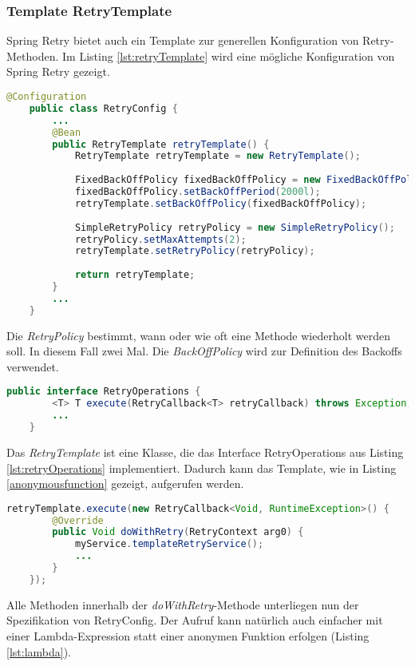 \subsubsection{Template RetryTemplate}
Spring Retry bietet auch ein Template zur generellen Konfiguration von Retry-Methoden. Im Listing \ref{lst:retryTemplate} wird eine mögliche Konfiguration von Spring Retry gezeigt.

\begin{lstlisting}[language=java, caption=RetryConfig.java, label=lst:retryTemplate]
	@Configuration
	public class RetryConfig {
		...
		@Bean
		public RetryTemplate retryTemplate() {
			RetryTemplate retryTemplate = new RetryTemplate();
			
			FixedBackOffPolicy fixedBackOffPolicy = new FixedBackOffPolicy();
			fixedBackOffPolicy.setBackOffPeriod(2000l);
			retryTemplate.setBackOffPolicy(fixedBackOffPolicy);
			
			SimpleRetryPolicy retryPolicy = new SimpleRetryPolicy();
			retryPolicy.setMaxAttempts(2);
			retryTemplate.setRetryPolicy(retryPolicy);
			
			return retryTemplate;
		}
		...
	}
\end{lstlisting}
Die \textit{RetryPolicy} bestimmt, wann oder wie oft eine Methode wiederholt werden soll. In diesem Fall zwei Mal. Die \textit{BackOffPolicy} wird zur Definition des Backoffs verwendet.

\begin{lstlisting}[language=java, caption=RetryOperations, label=lst:retryOperations]
	public interface RetryOperations {
		<T> T execute(RetryCallback<T> retryCallback) throws Exception;
		...
	}
\end{lstlisting}


Das \textit{RetryTemplate} ist eine Klasse, die das Interface RetryOperations aus Listing \ref{lst:retryOperations} implementiert. Dadurch kann das Template, wie in Listing \ref{anonymousfunction} gezeigt, aufgerufen werden.

\begin{lstlisting}[language=java, caption=Aufruf mit anonymer Funktion, label=anonymousfunction]
	retryTemplate.execute(new RetryCallback<Void, RuntimeException>() {
		@Override
		public Void doWithRetry(RetryContext arg0) {
			myService.templateRetryService();
			...
		}
	});
\end{lstlisting}

Alle Methoden innerhalb der \textit{doWithRetry}-Methode unterliegen nun der Spezifikation von RetryConfig.
Der Aufruf kann natürlich auch einfacher mit einer Lambda-Expression statt einer anonymen Funktion erfolgen (Listing \ref{lst:lambda}).

